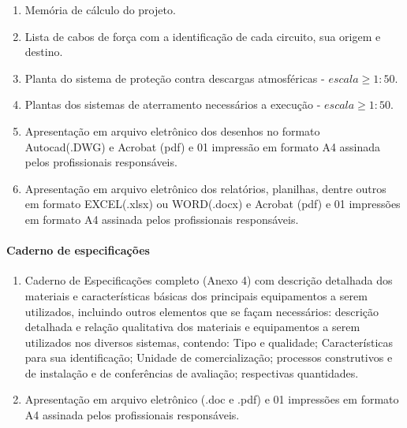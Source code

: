 \begin{enumerate}
	\item Memória de cálculo do projeto.
	
	\item Lista de cabos de força com a identificação de cada circuito, sua origem e destino.

	\item Planta do sistema de proteção contra descargas atmosféricas - $escala \geq 1:50$.

	\item Plantas dos sistemas de aterramento necessários a execução  - $escala \geq 1:50$.
	
	\item Apresentação em arquivo eletrônico dos desenhos no formato Autocad(.DWG) e Acrobat (pdf) e 01 impressão em formato A4 assinada pelos profissionais responsáveis.
	
	\item Apresentação em arquivo eletrônico dos relatórios, planilhas, dentre outros em formato EXCEL(.xlsx) ou WORD(.docx) e Acrobat (pdf) e 01 impressões em formato A4 assinada pelos profissionais responsáveis.
	
\end{enumerate}

\paragraph{Caderno de especificações}
\begin{enumerate}
	
	\item Caderno de Especificações completo (Anexo 4) com descrição detalhada dos materiais e características básicas dos principais equipamentos a serem utilizados, incluindo outros elementos que se façam necessários: descrição detalhada e relação qualitativa dos materiais e equipamentos a serem utilizados nos diversos sistemas, contendo: Tipo e qualidade; Características para sua identificação; Unidade de comercialização; processos construtivos e de instalação e de conferências de avaliação; respectivas quantidades.
	
	\item Apresentação em arquivo eletrônico (.doc e .pdf) e 01 impressões em formato A4 assinada pelos profissionais responsáveis.
\end{enumerate}


